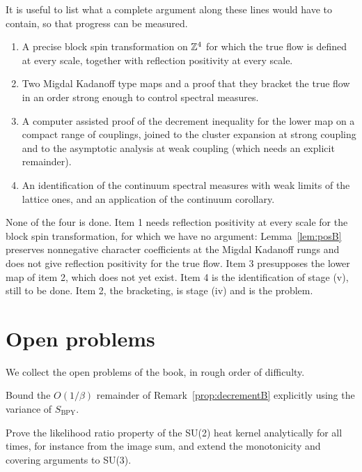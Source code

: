 It is useful to list what a complete argument along these lines would have to contain, so that progress can be measured.
\begin{enumerate}
\item A precise block spin transformation on $\mathbb{Z}^4$ for which the true flow is defined at every scale, together with reflection positivity at every scale.
\item Two Migdal Kadanoff type maps and a proof that they bracket the true flow in an order strong enough to control spectral measures.
\item A computer assisted proof of the decrement inequality for the lower map on a compact range of couplings, joined to the cluster expansion at strong coupling and to the asymptotic analysis at weak coupling (which needs an explicit remainder).
\item An identification of the continuum spectral measures with weak limits of the lattice ones, and an application of the continuum corollary.
\end{enumerate}
None of the four is done. Item 1 needs reflection positivity at every scale for the block spin transformation, for which we have no argument: Lemma~\ref{lem:posB} preserves nonnegative character coefficients at the Migdal Kadanoff rungs and does not give reflection positivity for the true flow. Item 3 presupposes the lower map of item 2, which does not yet exist. Item 4 is the identification of stage (v), still to be done. Item 2, the bracketing, is stage (iv) and is the problem.

\section{Open problems}

We collect the open problems of the book, in rough order of difficulty.

\begin{problem}\label{op:path1}
Bound the $O(1/\beta)$ remainder of Remark~\ref{prop:decrementB} explicitly using the variance of $S_{\mathrm{BPY}}$.
\end{problem}

\begin{problem}\label{op:path2}
Prove the likelihood ratio property of the SU(2) heat kernel analytically for all times, for instance from the image sum, and extend the monotonicity and covering arguments to SU(3).
\end{problem}

